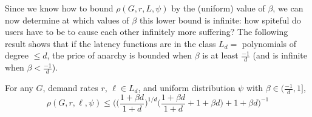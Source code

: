 Since we know how to bound $\rho(G,r,{L},\psi)$ by the (uniform) value of $\beta$, we can now determine at which values of $\beta$ this lower bound is infinite: how spiteful do users have to be to cause each other infinitely more suffering? The following result shows that if the latency functions are in the class $L_d =$ polynomials of degree $\le d$, the price of anarchy is bounded when $\beta$ is at least $\frac{-1}{d}$ (and is infinite when $\beta < \frac{-1}d$).
\begin{theorem}
    For any $G$, demand rates $r$, $\ell \in L_d$, 
and uniform distribution $\psi$ with $\beta \in (\frac{-1}{d}, 1]$,
    $$\rho(G,r,\ell,\psi) \le \Big(\Big(\frac{1+\beta d}{1+d}\Big)^{1/d}\Big(\frac{1+\beta d}{1+d} + 1 + \beta d\Big)+ 1 + \beta d\Big)^{-1}$$
\end{theorem}
